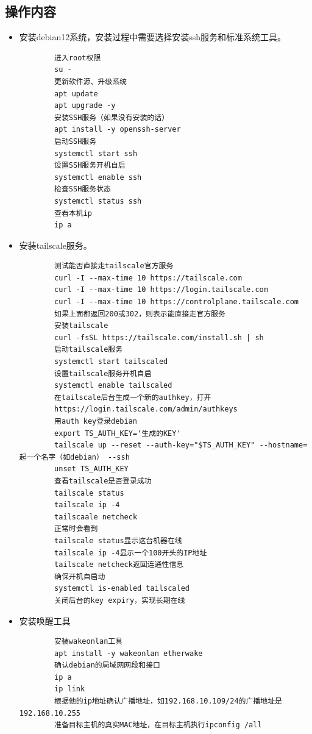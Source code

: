 \documentclass[12pt,a4paper]{ctexart}
\begin{document}
\subsection{操作内容}
\begin{itemize}[leftmargin=2em]
    \item 安装debian12系统，安装过程中需要选择安装ssh服务和标准系统工具。
    \begin{verbatim}
        进入root权限
        su -
        更新软件源、升级系统
        apt update
        apt upgrade -y
        安装SSH服务（如果没有安装的话）
        apt install -y openssh-server
        启动SSH服务
        systemctl start ssh
        设置SSH服务开机自启
        systemctl enable ssh
        检查SSH服务状态
        systemctl status ssh
        查看本机ip
        ip a

    \end{verbatim}
    \item 安装tailscale服务。
    \begin{verbatim}
        测试能否直接走tailscale官方服务
        curl -I --max-time 10 https://tailscale.com
        curl -I --max-time 10 https://login.tailscale.com
        curl -I --max-time 10 https://controlplane.tailscale.com
        如果上面都返回200或302，则表示能直接走官方服务
        安装tailscale
        curl -fsSL https://tailscale.com/install.sh | sh
        启动tailscale服务
        systemctl start tailscaled
        设置tailscale服务开机自启
        systemctl enable tailscaled
        在tailscale后台生成一个新的authkey，打开
        https://login.tailscale.com/admin/authkeys
        用auth key登录debian
        export TS_AUTH_KEY='生成的KEY'
        tailscale up --reset --auth-key="$TS_AUTH_KEY" --hostname=起一个名字（如debian） --ssh
        unset TS_AUTH_KEY
        查看tailscale是否登录成功
        tailscale status
        tailscale ip -4
        tailscaale netcheck
        正常时会看到
        tailscale status显示这台机器在线
        tailscale ip -4显示一个100开头的IP地址
        tailscale netcheck返回连通性信息
        确保开机自启动
        systemctl is-enabled tailscaled
        关闭后台的key expiry，实现长期在线

    \end{verbatim}
    \item 安装唤醒工具
    \begin{verbatim}
        安装wakeonlan工具
        apt install -y wakeonlan etherwake
        确认debian的局域网网段和接口
        ip a
        ip link
        根据他的ip地址确认广播地址，如192.168.10.109/24的广播地址是192.168.10.255
        准备目标主机的真实MAC地址，在目标主机执行ipconfig /all

    \end{verbatim}
\end{itemize}
\end{document}
